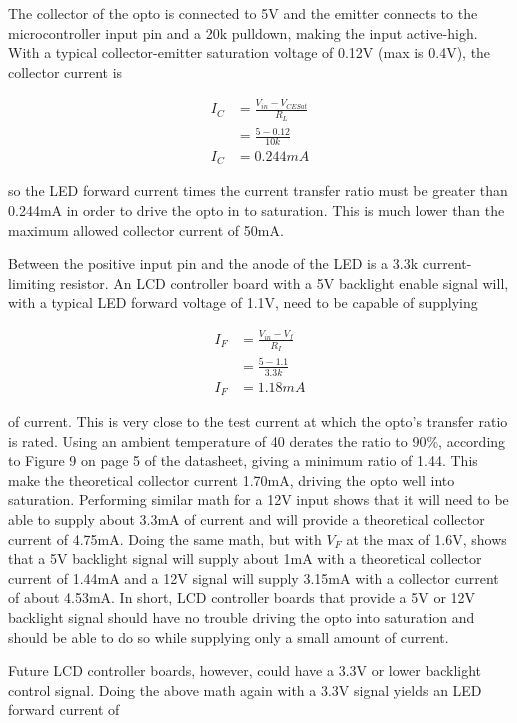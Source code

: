 \documentclass{article}
\begin{document}
The collector of the opto is connected to 5V and the emitter connects to the microcontroller input
pin and a 20k\textOmega{} pulldown, making the input active-high.  With a typical collector-emitter
saturation voltage of 0.12V (max is 0.4V), the collector current is

\begin{align*}
    I_C &= \frac{V_{in} - V_{CESat}}{R_L} \\
    &= \frac{5 - 0.12}{10k} \\
    I_C &= 0.244mA
\end{align*}

so the LED forward current times the current transfer ratio must be greater than 0.244mA in order to
drive the opto in to saturation.  This is much lower than the maximum allowed collector current of
50mA.

Between the positive input pin and the anode of the LED is a 3.3k\textOmega{} current-limiting
resistor.  An LCD controller board with a 5V backlight enable signal will, with a typical LED
forward voltage of 1.1V, need to be capable of supplying

\begin{align*}
    I_F &= \frac{V_{in} - V_f}{R_I} \\
    &= \frac{5 - 1.1}{3.3k} \\
    I_F &= 1.18mA
\end{align*}

of current.  This is very close to the test current at which the opto's transfer ratio is rated.
Using an ambient temperature of 40\textcelsius{} derates the ratio to 90\%, according to Figure 9 on
page 5 of the datasheet, giving a minimum ratio of 1.44.  This make the theoretical collector
current 1.70mA, driving the opto well into saturation.  Performing similar math for a 12V input
shows that it will need to be able to supply about 3.3mA of current and will provide a theoretical
collector current of 4.75mA.  Doing the same math, but with $V_F$ at the max of 1.6V, shows that a
5V backlight signal will supply about 1mA with a theoretical collector current of 1.44mA and a 12V
signal will supply 3.15mA with a collector current of about 4.53mA.  In short, LCD controller boards
that provide a 5V or 12V backlight signal should have no trouble driving the opto into saturation
and should be able to do so while supplying only a small amount of current.

Future LCD controller boards, however, could have a 3.3V or lower backlight control signal.  Doing
the above math again with a 3.3V signal yields an LED forward current of
\end{document}
